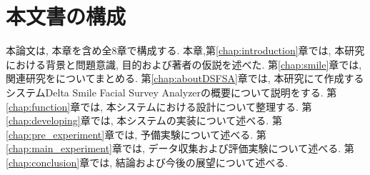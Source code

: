 


\section{本文書の構成}

本論文は, 本章を含め全8章で構成する.
本章,第\ref{chap:introduction}章では, 本研究における背景と問題意識, 目的および著者の仮説を述べた.
第\ref{chap:smile}章では, 関連研究をについてまとめる.
第\ref{chap:aboutDSFSA}章では, 本研究にて作成するシステムDelta Smile Facial Survey Analyzerの概要について説明をする.
第\ref{chap:function}章では, 本システムにおける設計について整理する.
第\ref{chap:developing}章では, 本システムの実装について述べる.
第\ref{chap:pre_experiment}章では, 予備実験について述べる.
第\ref{chap:main_experiment}章では, データ収集および評価実験について述べる.
第\ref{chap:conclusion}章では, 結論および今後の展望について述べる.
